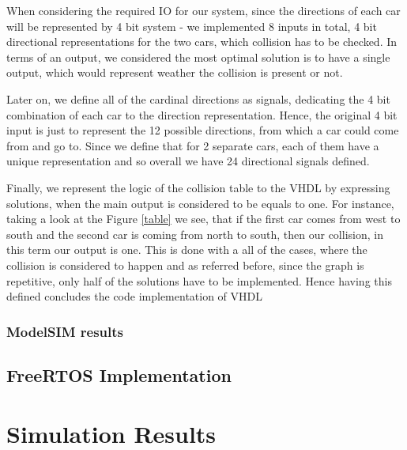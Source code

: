 \documentclass[conference]{IEEEtran}
\begin{document}
When considering the required IO for our system, since the directions of each car will be represented by 4 bit system - we implemented 8 inputs in total, 4 bit directional representations for the two cars, which collision has to be checked. In terms of an output, we considered the most optimal solution is to have a single output, which would represent weather the collision is present or not.

Later on, we define all of the cardinal directions as signals, dedicating the 4 bit combination of each car to the direction representation. Hence, the original 4 bit input is just to represent the 12 possible directions, from which a car could come from and go to. Since we define that for 2 separate cars, each of them have a unique representation and so overall we have 24 directional signals defined.

Finally, we represent the logic of the collision table to the VHDL by expressing solutions, when the main output is considered to be equals to one. For instance, taking a look at the Figure \ref{table} we see, that if the first car comes from west to south and the second car is coming from north to south, then our collision, in this term our output is one. This is done with a all of the cases, where the collision is considered to happen and as referred before, since the graph is repetitive, only half of the solutions have to be implemented. Hence having this defined concludes the code implementation of VHDL

\subsubsection{ModelSIM results}



\subsection{FreeRTOS Implementation}



\section{Simulation Results}
\end{document}
